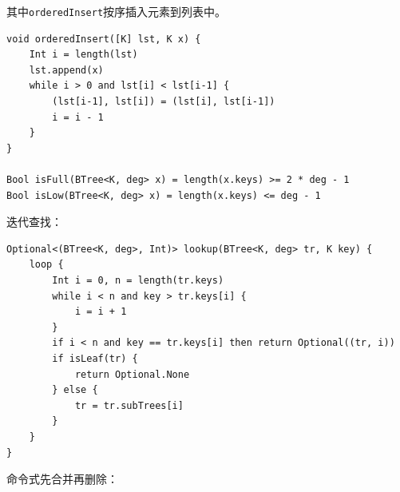 \documentclass[b5paper]{ctexart}
\begin{document}
其中\texttt{orderedInsert}按序插入元素到列表中。

\begin{lstlisting}[language = Bourbaki]
void orderedInsert([K] lst, K x) {
    Int i = length(lst)
    lst.append(x)
    while i > 0 and lst[i] < lst[i-1] {
        (lst[i-1], lst[i]) = (lst[i], lst[i-1])
        i = i - 1
    }
}

Bool isFull(BTree<K, deg> x) = length(x.keys) >= 2 * deg - 1
Bool isLow(BTree<K, deg> x) = length(x.keys) <= deg - 1
\end{lstlisting}

迭代查找：

\begin{lstlisting}[language = Bourbaki]
Optional<(BTree<K, deg>, Int)> lookup(BTree<K, deg> tr, K key) {
    loop {
        Int i = 0, n = length(tr.keys)
        while i < n and key > tr.keys[i] {
            i = i + 1
        }
        if i < n and key == tr.keys[i] then return Optional((tr, i))
        if isLeaf(tr) {
            return Optional.None
        } else {
            tr = tr.subTrees[i]
        }
    }
}
\end{lstlisting}

命令式先合并再删除：
\end{document}
